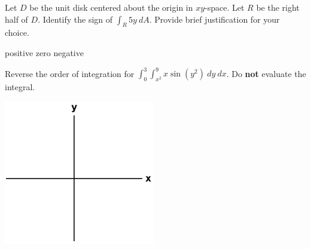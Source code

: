 \documentclass[12pt,letterpaper,noanswers]{exam}
\begin{document}
 \pdfpageheight 11in 
  \pdfpagewidth 8.5in



\begin{questions}
\item Let $D$ be the unit disk centered about the origin in $xy$-space.  Let $R$ be the right half of $D$.  Identify the sign of $\displaystyle\int_R 5y\ dA$.  Provide brief justification for your choice.

\begin{oneparcheckboxes}
\choice positive
\choice zero
\choice negative
\end{oneparcheckboxes}

\vfill

\item Reverse the order of integration for $\displaystyle\int_0^3\int_{x^2}^9 x\sin(y^2)\ dy\ dx$.  Do \textbf{not} evaluate the integral.

\includegraphics[height=2.5in]{img/C02axes-2.png}

\vfill

\end{questions}
\end{document}
